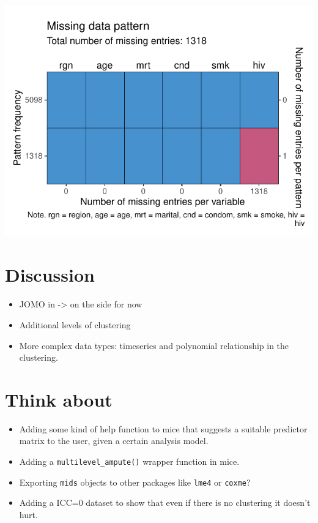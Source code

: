 \documentclass[
]{jss}
\begin{document}
\begin{CodeChunk}


\begin{center}\includegraphics{Manuscript_files/figure-latex/hiv-1} \end{center}

\end{CodeChunk}

\hypertarget{discussion}{%
\section{Discussion}\label{discussion}}

\begin{itemize}
\item
  JOMO in  -\textgreater{} on the side for now
\item
  Additional levels of clustering
\item
  More complex data types: timeseries and polynomial relationship in the
  clustering.
\end{itemize}

\hypertarget{think-about}{%
\section{Think about}\label{think-about}}

\begin{itemize}
\item
  Adding some kind of help function to mice that suggests a suitable
  predictor matrix to the user, given a certain analysis model.
\item
  Adding a \texttt{multilevel\_ampute()} wrapper function in mice.
\item
  Exporting \texttt{mids} objects to other packages like \texttt{lme4}
  or \texttt{coxme}?
\item
  Adding a ICC=0 dataset to show that even if there is no clustering it
  doesn't hurt.
\end{itemize}

\renewcommand\refname{References}

\end{document}
